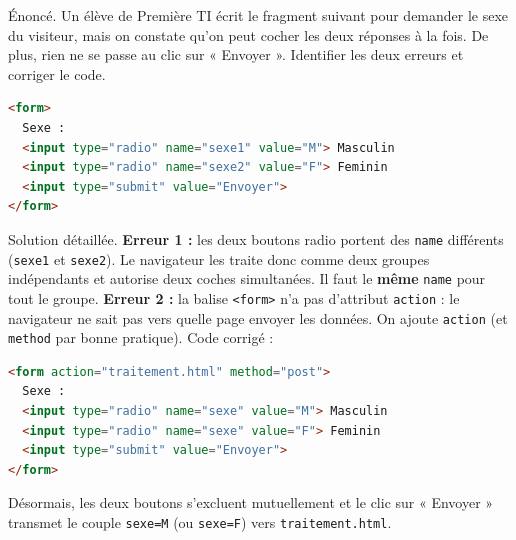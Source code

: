 \documentclass[11pt]{article}
\begin{document}
\begin{exoresolu}
Énoncé. Un élève de Première TI écrit le fragment suivant pour demander le sexe du visiteur, mais on constate qu'on peut cocher les deux réponses à la fois. De plus, rien ne se passe au clic sur « Envoyer ». Identifier les deux erreurs et corriger le code.
\begin{lstlisting}[language=HTML]
<form>
  Sexe :
  <input type="radio" name="sexe1" value="M"> Masculin
  <input type="radio" name="sexe2" value="F"> Feminin
  <input type="submit" value="Envoyer">
</form>
\end{lstlisting}
\tcblower
Solution détaillée.
\textbf{Erreur 1 :} les deux boutons radio portent des \texttt{name} différents (\texttt{sexe1} et \texttt{sexe2}). Le navigateur les traite donc comme deux groupes indépendants et autorise deux coches simultanées. Il faut le \textbf{même} \texttt{name} pour tout le groupe.
\textbf{Erreur 2 :} la balise \texttt{<form>} n'a pas d'attribut \texttt{action} : le navigateur ne sait pas vers quelle page envoyer les données. On ajoute \texttt{action} (et \texttt{method} par bonne pratique).
Code corrigé :
\begin{lstlisting}[language=HTML]
<form action="traitement.html" method="post">
  Sexe :
  <input type="radio" name="sexe" value="M"> Masculin
  <input type="radio" name="sexe" value="F"> Feminin
  <input type="submit" value="Envoyer">
</form>
\end{lstlisting}
Désormais, les deux boutons s'excluent mutuellement et le clic sur « Envoyer » transmet le couple \texttt{sexe=M} (ou \texttt{sexe=F}) vers \texttt{traitement.html}.
\end{exoresolu}
\end{document}
